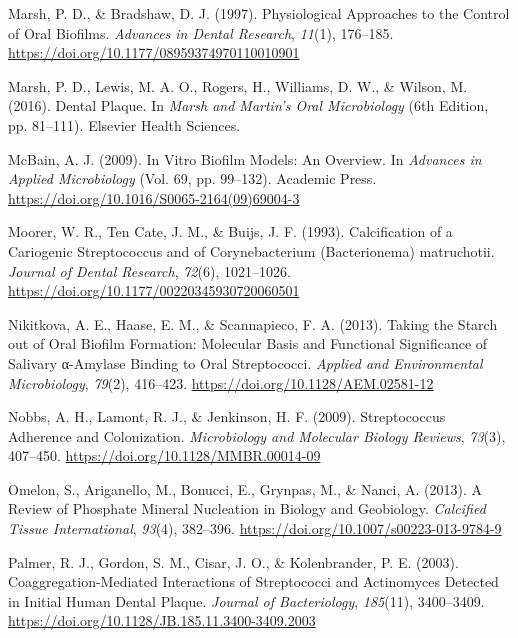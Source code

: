 \documentclass[
  letterpaper,
]{book}
\newlength{\cslhangindent}
\newlength{\cslentryspacingunit} %
\newenvironment{CSLReferences}[2] %
 {%
  \setlength{\parindent}{0pt}
  \ifodd #1
  \let\oldpar\par
  \def\par{\hangindent=\cslhangindent\oldpar}
  \fi
  \setlength{\parskip}{#2\cslentryspacingunit}
 }%
 {}
\begin{document}
\begin{CSLReferences}{1}{0}
\leavevmode{}%
Marsh, P. D., \& Bradshaw, D. J. (1997). Physiological {Approaches} to
the {Control} of {Oral Biofilms}. \emph{Advances in Dental Research},
\emph{11}(1), 176--185.
\url{https://doi.org/10.1177/08959374970110010901}

\leavevmode{}%
Marsh, P. D., Lewis, M. A. O., Rogers, H., Williams, D. W., \& Wilson,
M. (2016). Dental {Plaque}. In \emph{Marsh and {Martin}'s {Oral
Microbiology}} (6th Edition, pp. 81--111). {Elsevier Health Sciences}.

\leavevmode{}%
McBain, A. J. (2009). In {Vitro Biofilm Models}: {An Overview}. In
\emph{Advances in {Applied Microbiology}} (Vol. 69, pp. 99--132).
{Academic Press}. \url{https://doi.org/10.1016/S0065-2164(09)69004-3}

\leavevmode{}%
Moorer, W. R., Ten Cate, J. M., \& Buijs, J. F. (1993). Calcification of
a {Cariogenic Streptococcus} and of {Corynebacterium} ({Bacterionema})
matruchotii. \emph{Journal of Dental Research}, \emph{72}(6),
1021--1026. \url{https://doi.org/10.1177/00220345930720060501}

\leavevmode{}%
Nikitkova, A. E., Haase, E. M., \& Scannapieco, F. A. (2013). Taking the
{Starch} out of {Oral Biofilm Formation}: {Molecular Basis} and
{Functional Significance} of {Salivary} α-{Amylase Binding} to {Oral
Streptococci}. \emph{Applied and Environmental Microbiology},
\emph{79}(2), 416--423. \url{https://doi.org/10.1128/AEM.02581-12}

\leavevmode{}%
Nobbs, A. H., Lamont, R. J., \& Jenkinson, H. F. (2009). Streptococcus
{Adherence} and {Colonization}. \emph{Microbiology and Molecular Biology
Reviews}, \emph{73}(3), 407--450.
\url{https://doi.org/10.1128/MMBR.00014-09}

\leavevmode{}%
Omelon, S., Ariganello, M., Bonucci, E., Grynpas, M., \& Nanci, A.
(2013). A {Review} of {Phosphate Mineral Nucleation} in {Biology} and
{Geobiology}. \emph{Calcified Tissue International}, \emph{93}(4),
382--396. \url{https://doi.org/10.1007/s00223-013-9784-9}

\leavevmode{}%
Palmer, R. J., Gordon, S. M., Cisar, J. O., \& Kolenbrander, P. E.
(2003). Coaggregation-{Mediated Interactions} of {Streptococci} and
{Actinomyces Detected} in {Initial Human Dental Plaque}. \emph{Journal
of Bacteriology}, \emph{185}(11), 3400--3409.
\url{https://doi.org/10.1128/JB.185.11.3400-3409.2003}


\end{CSLReferences}
\end{document}
